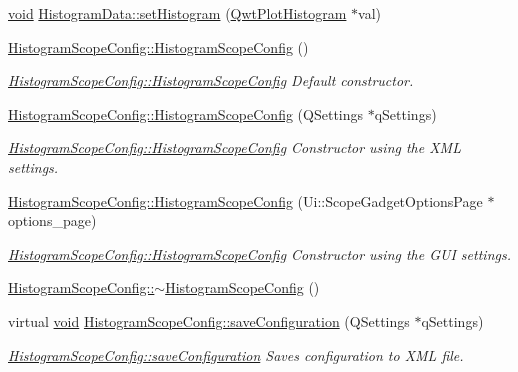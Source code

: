 \begin{DoxyCompactItemize}
\item 
\hyperlink{group___u_a_v_objects_plugin_ga444cf2ff3f0ecbe028adce838d373f5c}{void} \hyperlink{group___scope_plugin_ga2f4dbd730d5616dbd15922f23f775d02}{Histogram\-Data\-::set\-Histogram} (\hyperlink{class_qwt_plot_histogram}{Qwt\-Plot\-Histogram} $\ast$val)
\item 
\hyperlink{group___scope_plugin_ga3770fc706fe9b5fdd16bad59dfc23fa1}{Histogram\-Scope\-Config\-::\-Histogram\-Scope\-Config} ()
\begin{DoxyCompactList}\small\item\em \hyperlink{group___scope_plugin_ga3770fc706fe9b5fdd16bad59dfc23fa1}{Histogram\-Scope\-Config\-::\-Histogram\-Scope\-Config} Default constructor. \end{DoxyCompactList}\item 
\hyperlink{group___scope_plugin_ga0a412b8c840e9f5bc746d492cafed2a5}{Histogram\-Scope\-Config\-::\-Histogram\-Scope\-Config} (Q\-Settings $\ast$q\-Settings)
\begin{DoxyCompactList}\small\item\em \hyperlink{group___scope_plugin_ga3770fc706fe9b5fdd16bad59dfc23fa1}{Histogram\-Scope\-Config\-::\-Histogram\-Scope\-Config} Constructor using the X\-M\-L settings. \end{DoxyCompactList}\item 
\hyperlink{group___scope_plugin_gaa8c3ad4f914751d27033f2c70ea2fc2c}{Histogram\-Scope\-Config\-::\-Histogram\-Scope\-Config} (Ui\-::\-Scope\-Gadget\-Options\-Page $\ast$options\-\_\-page)
\begin{DoxyCompactList}\small\item\em \hyperlink{group___scope_plugin_ga3770fc706fe9b5fdd16bad59dfc23fa1}{Histogram\-Scope\-Config\-::\-Histogram\-Scope\-Config} Constructor using the G\-U\-I settings. \end{DoxyCompactList}\item 
\hyperlink{group___scope_plugin_gafbd12c48895f5b324a0048f956c2a773}{Histogram\-Scope\-Config\-::$\sim$\-Histogram\-Scope\-Config} ()
\item 
virtual \hyperlink{group___u_a_v_objects_plugin_ga444cf2ff3f0ecbe028adce838d373f5c}{void} \hyperlink{group___scope_plugin_ga08dd5f7ac27b067ed6eddc9e645bce45}{Histogram\-Scope\-Config\-::save\-Configuration} (Q\-Settings $\ast$q\-Settings)
\begin{DoxyCompactList}\small\item\em \hyperlink{group___scope_plugin_ga08dd5f7ac27b067ed6eddc9e645bce45}{Histogram\-Scope\-Config\-::save\-Configuration} Saves configuration to X\-M\-L file. \end{DoxyCompactList}\item 

\end{DoxyCompactItemize}
